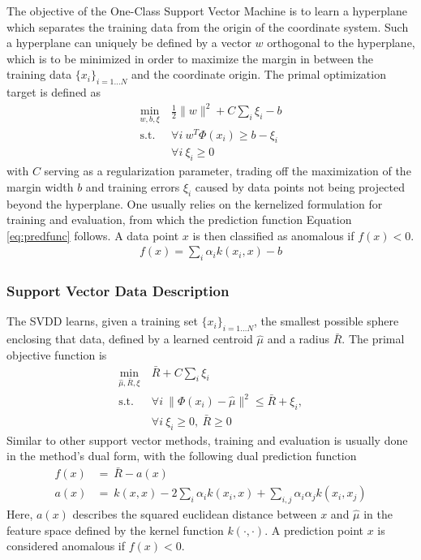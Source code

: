 \documentclass{llncs}
\begin{document}
The objective of the One-Class Support Vector Machine is to learn a hyperplane which separates the training data from the origin of the coordinate system. Such a hyperplane can uniquely be defined by a vector $w$ orthogonal to the hyperplane, which is to be minimized in order to maximize the margin in between the training data $\lbrace x_i \rbrace_{i=1\dots N}$ and the coordinate origin. 
The primal optimization target is defined as
\begin{align}
\underset{w,b,\xi}{\min} &~\frac{1}{2}\|w\|^2 + C \sum\limits_{i}\xi_i - b \label{eq:ocsvm_prim}\\
\text{s.t.} & ~\forall i ~ w^T\Phi(x_i) \geq b - \xi_i \nonumber\\
			& ~\forall i ~ \xi_i \geq 0 \nonumber
\end{align}
with $C$ serving as a regularization parameter, trading off the maximization of the margin width $b$ and training errors $\xi_i$ caused by data points not being projected beyond the hyperplane. One usually relies on the kernelized formulation for training and evaluation, from which the prediction function Equation \ref{eq:predfunc} follows. A data point $x$ is then classified as anomalous if $f(x)<0$.
\begin{align}
f(x) = \sum\limits_i \alpha_i k(x_i,x) - b
\label{eq:predfunc}
\end{align}

\subsubsection{Support Vector Data Description}



The SVDD learns, given a training set $\lbrace x_i \rbrace_{i=1\dots N}$,  the smallest possible sphere enclosing that data, defined by a learned centroid $\hat\mu$ and a radius $\bar R$. The primal objective function is
\begin{align}
\underset{\hat{\mu},\bar{R},\xi}{\min} & ~\bar{R} + C \sum\limits_{i}\xi_i \label{eq:svdd_prim}\\
\text{s.t.} & ~\forall i~\|\Phi(x_i) - \hat{\mu}\|^2 \leq \bar{R} + \xi_i,\nonumber\\
			& ~\forall i~\xi_i \geq 0, ~\bar{R} \geq 0 \nonumber 
\end{align}
Similar to other support vector methods, training and evaluation is usually done in the method's dual form, with the following dual prediction function
\begin{align}
f(x) & = ~\bar{R} - a(x) \label{eq:svddpred} \\
a(x) & = ~k(x,x) - 2\sum\limits_i \alpha_i k(x_i,x) + \sum\limits_{i,j} \alpha_i\alpha_j k(x_i,x_j) \label{eq:svddpred_a}
\end{align}
Here, $a(x)$ describes the squared euclidean distance between $x$ and $\hat\mu$ in the feature space defined by the kernel function $k(\cdot, \cdot)$. A prediction point $x$ is considered anomalous if $f(x)<0$.
%
 
\end{document}
